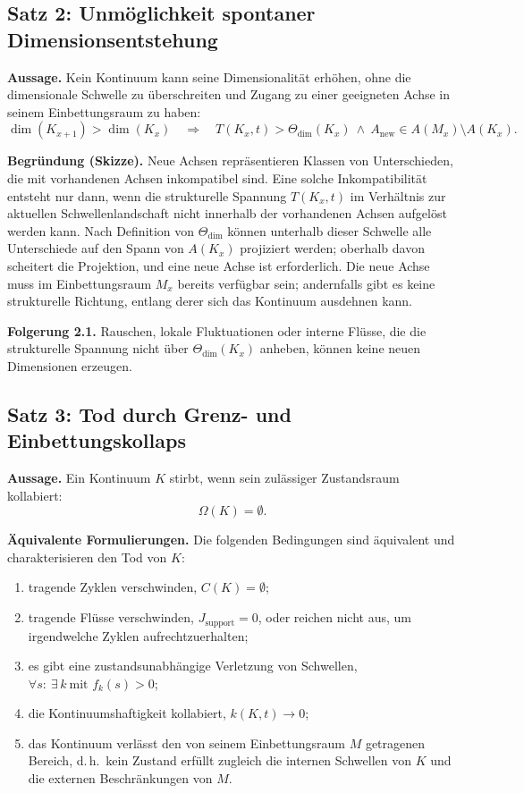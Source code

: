 \subsection{Satz 2: Unmöglichkeit spontaner Dimensionsentstehung}

\textbf{Aussage.}
Kein Kontinuum kann seine Dimensionalität erhöhen, ohne die dimensionale Schwelle zu überschreiten und Zugang zu einer geeigneten Achse in seinem Einbettungsraum zu haben:
\[
    \dim(K_{x+1}) > \dim(K_x)
    \quad\Rightarrow\quad
    T(K_x,t) > \Theta_{\mathrm{dim}}(K_x)
    \ \wedge\
    A_{\mathrm{new}} \in A(M_x)\setminus A(K_x).
\]

\textbf{Begründung (Skizze).}
Neue Achsen repräsentieren Klassen von Unterschieden, die mit vorhandenen Achsen inkompatibel sind.
Eine solche Inkompatibilität entsteht nur dann, wenn die strukturelle Spannung \(T(K_x,t)\) im Verhältnis zur aktuellen Schwellenlandschaft nicht innerhalb der vorhandenen Achsen aufgelöst werden kann.
Nach Definition von \(\Theta_{\mathrm{dim}}\) können unterhalb dieser Schwelle alle Unterschiede auf den Spann von \(A(K_x)\) projiziert werden; oberhalb davon scheitert die Projektion, und eine neue Achse ist erforderlich.
Die neue Achse muss im Einbettungsraum \(M_x\) bereits verfügbar sein; andernfalls gibt es keine strukturelle Richtung, entlang derer sich das Kontinuum ausdehnen kann.

\textbf{Folgerung 2.1.}
Rauschen, lokale Fluktuationen oder interne Flüsse, die die strukturelle Spannung nicht über \(\Theta_{\mathrm{dim}}(K_x)\) anheben, können keine neuen Dimensionen erzeugen.

\subsection{Satz 3: Tod durch Grenz- und Einbettungskollaps}

\textbf{Aussage.}
Ein Kontinuum \(K\) stirbt, wenn sein zulässiger Zustandsraum kollabiert:
\[
    \Omega(K) = \emptyset.
\]

\textbf{Äquivalente Formulierungen.}
Die folgenden Bedingungen sind äquivalent und charakterisieren den Tod von \(K\):
\begin{enumerate}
    \item tragende Zyklen verschwinden, \(C(K) = \emptyset\);
    \item tragende Flüsse verschwinden, \(J_{\mathrm{support}} = 0\), oder reichen nicht aus, um irgendwelche Zyklen aufrechtzuerhalten;
    \item es gibt eine zustandsunabhängige Verletzung von Schwellen, \(\forall s:\ \exists\,k\ \text{mit } f_k(s) > 0\);
    \item die Kontinuumshaftigkeit kollabiert, \(k(K,t) \to 0\);
    \item das Kontinuum verlässt den von seinem Einbettungsraum \(M\) getragenen Bereich, d.\,h.\ kein Zustand erfüllt zugleich die internen Schwellen von \(K\) und die externen Beschränkungen von \(M\).
\end{enumerate}

